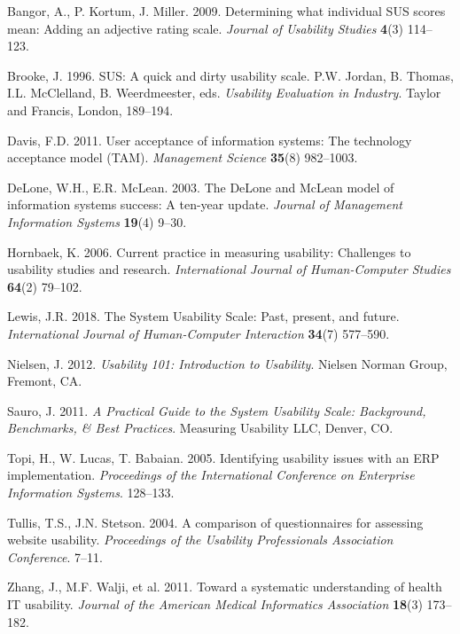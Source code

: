 \documentclass[blindrev]{informs3}
\begin{document}
\begin{thebibliography}{99}

 Bangor, A., P. Kortum, J. Miller. 2009. Determining what individual SUS scores mean: Adding an adjective rating scale. \textit{Journal of Usability Studies} \textbf{4}(3) 114--123.

 Brooke, J. 1996. SUS: A quick and dirty usability scale. P.W. Jordan, B. Thomas, I.L. McClelland, B. Weerdmeester, eds. \textit{Usability Evaluation in Industry}. Taylor and Francis, London, 189--194.

 Davis, F.D. 2011. User acceptance of information systems: The technology acceptance model (TAM). \textit{Management Science} \textbf{35}(8) 982--1003.

 DeLone, W.H., E.R. McLean. 2003. The DeLone and McLean model of information systems success: A ten-year update. \textit{Journal of Management Information Systems} \textbf{19}(4) 9--30.

 Hornbaek, K. 2006. Current practice in measuring usability: Challenges to usability studies and research. \textit{International Journal of Human-Computer Studies} \textbf{64}(2) 79--102.

 Lewis, J.R. 2018. The System Usability Scale: Past, present, and future. \textit{International Journal of Human-Computer Interaction} \textbf{34}(7) 577--590.

 Nielsen, J. 2012. \textit{Usability 101: Introduction to Usability}. Nielsen Norman Group, Fremont, CA.

 Sauro, J. 2011. \textit{A Practical Guide to the System Usability Scale: Background, Benchmarks, & Best Practices}. Measuring Usability LLC, Denver, CO.

 Topi, H., W. Lucas, T. Babaian. 2005. Identifying usability issues with an ERP implementation. \textit{Proceedings of the International Conference on Enterprise Information Systems}. 128--133.

 Tullis, T.S., J.N. Stetson. 2004. A comparison of questionnaires for assessing website usability. \textit{Proceedings of the Usability Professionals Association Conference}. 7--11.

 Zhang, J., M.F. Walji, et al. 2011. Toward a systematic understanding of health IT usability. \textit{Journal of the American Medical Informatics Association} \textbf{18}(3) 173--182.

\end{thebibliography}
\end{document}

